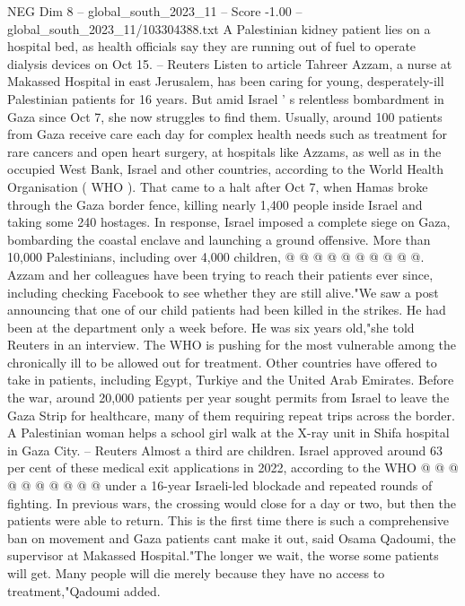 \begin{textsample}{NEG Dim 8 – global\_south\_2023\_11 – Score -1.00 – global\_south\_2023\_11/103304388.txt}  \label{ex:f8_neg_183}
A Palestinian kidney patient lies on a hospital bed, as health officials say they are running out of fuel to operate dialysis devices on Oct 15. -- Reuters Listen to article Tahreer Azzam, a nurse at Makassed Hospital in east Jerusalem, has been caring for young, desperately-ill Palestinian patients for 16 years.
But amid Israel ' s relentless bombardment in Gaza since Oct 7, she now struggles to find them.
Usually, around 100 patients from Gaza receive care each day for complex health needs such as treatment for rare cancers and open heart surgery, at hospitals like Azzams, as well as in the occupied West Bank, Israel and other countries, according to the World Health Organisation ( WHO ).
That came to a halt after Oct 7, when Hamas broke through the Gaza border fence, killing nearly 1,400 people inside Israel and taking some 240 hostages.
In response, Israel imposed a complete siege on Gaza, bombarding the coastal enclave and launching a ground offensive.
More than 10,000 Palestinians, including over 4,000 children, @ @ @ @ @ @ @ @ @ @.
Azzam and her colleagues have been trying to reach their patients ever since, including checking Facebook to see whether they are still alive."We saw a post announcing that one of our child patients had been killed in the strikes.
He had been at the department only a week before.
He was six years old,"she told Reuters in an interview.
The WHO is pushing for the most vulnerable among the chronically ill to be allowed out for treatment.
Other countries have offered to take in patients, including Egypt, Turkiye and the United Arab Emirates.
Before the war, around 20,000 patients per year sought permits from Israel to leave the Gaza Strip for healthcare, many of them requiring repeat trips across the border.
A Palestinian woman helps a school girl walk at the X-ray unit in Shifa hospital in Gaza City. -- Reuters Almost a third are children.
Israel approved around 63 per cent of these medical exit applications in 2022, according to the WHO @ @ @ @ @ @ @ @ @ @ under a 16-year Israeli-led blockade and repeated rounds of fighting.
In previous wars, the crossing would close for a day or two, but then the patients were able to return.
This is the first time there is such a comprehensive ban on movement and Gaza patients cant make it out, said Osama Qadoumi, the supervisor at Makassed Hospital."The longer we wait, the worse some patients will get.
Many people will die merely because they have no access to treatment,"Qadoumi added.

\end{textsample}
